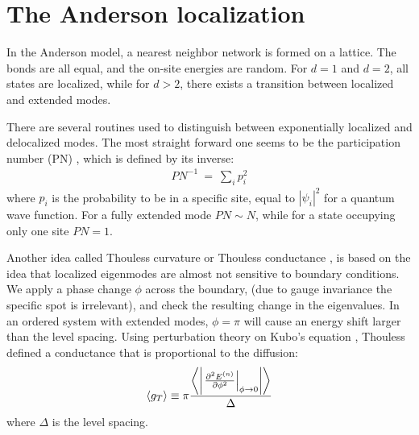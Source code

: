 \section{The Anderson localization}\label{sec:anderson}

In the Anderson model\cite{anderson_absence_1958}, a nearest neighbor network is formed
on a lattice. The bonds are all equal, and the on-site energies are random.
For $d=1$ and $d=2$, all states are localized, while for $d>2$, there exists
a transition between localized and extended modes. 


%
%



There are several routines used to distinguish between exponentially localized and delocalized modes.
The most straight forward one seems to be the participation number (PN) 
\cite{edwards_numerical_1972}, which is defined by its inverse:
%
\begin{align}
PN^{-1} \ =\ \sum_i p_i^2
\end{align}
where $p_i$ is the probability to be in a specific site, equal to $|\psi_i|^2$ 
for a quantum wave function. For a fully extended mode $PN\sim N$, while for a state
occupying only one site $PN = 1 $.


Another idea called Thouless curvature or Thouless conductance 
\cite{edwards_numerical_1972,thouless_electrons_1974,braun_level_1997}, is based
on the idea that localized eigenmodes are almost not sensitive to boundary conditions. We apply a 
phase change $\phi$ across the boundary, (due to gauge invariance the specific spot is irrelevant),
and check the resulting change in the eigenvalues. 
In an ordered system with extended modes, $\phi=\pi$ will cause an energy
shift larger than the level spacing. 
Using perturbation theory on Kubo's equation \cite{kubo_statistical-mechanical_1957},
Thouless defined a conductance that is proportional to the diffusion: 
\begin{align}\label{eq:thouless}
\left\langle g_T\right\rangle  \equiv \pi \frac{\left\langle \left|\left. \frac{\partial ^2 E^{(n)}}{\partial \phi^2}\right|_{\phi\rightarrow 0}\right|\right\rangle}{\Delta}
\end{align}
where $\Delta$ is the level spacing.



